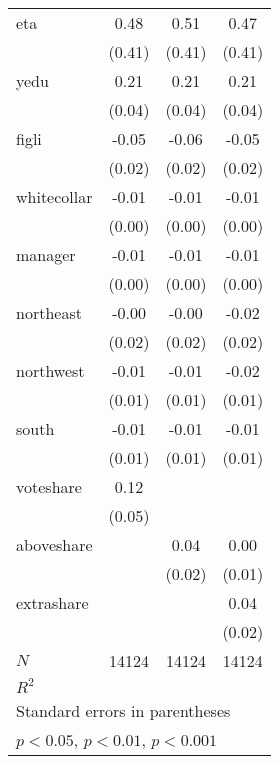 {\begin{tabular}{l*{3}{c}}
eta       &     0.48         &     0.51         &     0.47         \\
          &   (0.41)         &   (0.41)         &   (0.41)         \\
[1em]
yedu      &     0.21\sym{***}&     0.21\sym{***}&     0.21\sym{***}\\
          &   (0.04)         &   (0.04)         &   (0.04)         \\
[1em]
figli     &    -0.05\sym{**} &    -0.06\sym{**} &    -0.05\sym{**} \\
          &   (0.02)         &   (0.02)         &   (0.02)         \\
[1em]
whitecollar&    -0.01\sym{**} &    -0.01\sym{**} &    -0.01\sym{**} \\
          &   (0.00)         &   (0.00)         &   (0.00)         \\
[1em]
manager   &    -0.01\sym{***}&    -0.01\sym{***}&    -0.01\sym{***}\\
          &   (0.00)         &   (0.00)         &   (0.00)         \\
[1em]
northeast &    -0.00         &    -0.00         &    -0.02         \\
          &   (0.02)         &   (0.02)         &   (0.02)         \\
[1em]
northwest &    -0.01         &    -0.01         &    -0.02         \\
          &   (0.01)         &   (0.01)         &   (0.01)         \\
[1em]
south     &    -0.01         &    -0.01         &    -0.01         \\
          &   (0.01)         &   (0.01)         &   (0.01)         \\
[1em]
voteshare &     0.12\sym{*}  &                  &                  \\
          &   (0.05)         &                  &                  \\
[1em]
aboveshare&                  &     0.04         &     0.00         \\
          &                  &   (0.02)         &   (0.01)         \\
[1em]
extrashare&                  &                  &     0.04\sym{**} \\
          &                  &                  &   (0.02)         \\
\hline
\(N\)     &    14124         &    14124         &    14124         \\
\(R^{2}\) &                  &                  &                  \\
\hline\hline
\multicolumn{4}{l}{\footnotesize Standard errors in parentheses}\\
\multicolumn{4}{l}{\footnotesize \sym{*} \(p<0.05\), \sym{**} \(p<0.01\), \sym{***} \(p<0.001\)}\\
\end{tabular}
}
